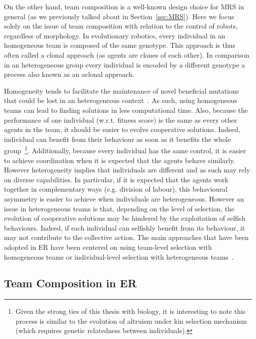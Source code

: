     On the other hand, team composition is a well-known design choice for MRS in general (as we previously talked about in Section~\ref{sec:MRS}). Here we focus solely on the issue of team composition with relation to the control of robots, regardless of morphology. In evolutionary robotics, every individual in an homogeneous team is composed of the same genotype. This approach is thus often called a clonal approach (as agents are clones of each other). In comparison in an heterogeneous group every individual is encoded by a different genotype a process also known as an aclonal approach.

    Homogeneity tends to facilitate the maintenance of novel beneficial mutations that could be lost in an heterogeneous context~\parencite{Quinn2001}. As such, using homogeneous teams can lead to finding solutions in less computational time. Also, because the performance of one individual (w.r.t. fitness score) is the same as every other agents in the team, it should be easier to evolve cooperative solutions. Indeed, individual can benefit from their behaviour as soon as it benefits the whole group~\footnote{Given the strong ties of this thesis with biology, it is interesting to note this process is similar to the evolution of altruism under kin selection mechanism (which requires genetic relatedness between individuals).}. Additionally, because every individual has the same control, it is easier to achieve coordination when it is expected that the agents behave similarly. However heterogeneity implies that individuals are different and as such may rely on diverse capabilities. In particular, if it is expected that the agents work together in complementary ways (e.g. division of labour), this behavioural asymmetry is easier to achieve when individuals are heterogeneous. However an issue in heterogeneous teams is that, depending on the level of selection, the evolution of cooperative solutions may be hindered by the exploitation of selfish behaviours. Indeed, if each individual can selfishly benefit from its behaviour, it may not contribute to the collective action. The main approaches that have been adopted in ER have been centered on using team-level selection with homogeneous teams or individual-level selection with heterogeneous teams~\parencite{Waibel2009}.

  \subsection{Team Composition in ER} %

